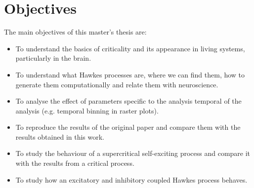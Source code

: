 \chapter{Objectives} \label{ch:objectives}

The main objectives of this master's thesis are:

\begin{itemize}
    \item To understand the basics of criticality and its appearance in living systems, particularly in the brain. 
    \item To understand what Hawkes processes are, where we can find them, how to generate them computationally and relate them with neuroscience.
    \item To analyse the effect of parameters specific to the analysis temporal of the analysis (e.g. temporal binning in raster plots).
    \item To reproduce the results of the original paper \cite{notarmuzi2021percolation} and compare them with the results obtained in this work.
    \item To study the behaviour of a supercritical self-exciting process and compare it with the results from a critical process. 
    \item To study how an excitatory and inhibitory coupled Hawkes process behaves.
\end{itemize}